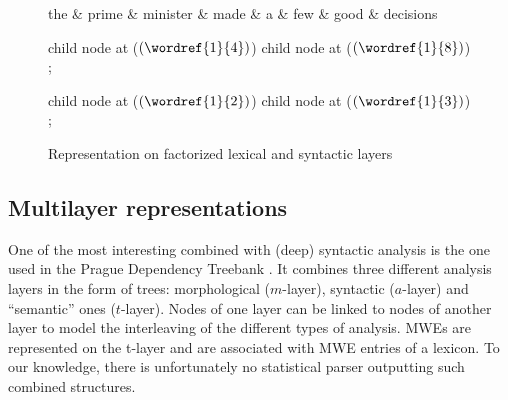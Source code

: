 \documentclass[output=paper]{langsci/langscibook}
\begin{document}
\begin{figure}[t]
\small
\begin{center}
\begin{dependency}[edge unit distance=2ex]
\begin{deptext}[column sep=.7cm]
the \& prime \& minister \& made \& a \& few \& good \& decisions \\
\end{deptext}


child{
 node at ($(\wordref{1}{4})$) {}
}
child{
 node at ($(\wordref{1}{8})$) {}
};


child{
 node at ($(\wordref{1}{2})$) {}
}
child{
 node at ($(\wordref{1}{3})$) {}
};


\end{dependency}
\vspace{-0.3cm}
\caption{Representation on factorized lexical and syntactic layers \citep{constantnivre16}}
\label{con:fig:combined}
\end{center}
\end{figure}




\subsection{Multilayer representations}
\label{con:ssec:multilayer}

One of the most interesting  combined with (deep) syntactic analysis is the one used in the Prague Dependency Treebank \citep{prague}. It combines three different analysis layers in the form of trees: morphological ($m$-layer), syntactic ($a$-layer) and ``semantic'' ones ($t$-layer). Nodes of one layer can be linked to nodes of another layer to model the interleaving of the different types of analysis. MWEs are represented on the t-layer and are associated with MWE entries of a lexicon. To our knowledge, there is unfortunately no statistical parser outputting such combined structures. 
\end{document}
